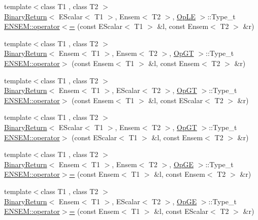 \begin{DoxyCompactItemize}
\item 
{\footnotesize template$<$class T1 , class T2 $>$ }\\\mbox{\hyperlink{structBinaryReturn}{Binary\+Return}}$<$ E\+Scalar$<$ T1 $>$, Ensem$<$ T2 $>$, \mbox{\hyperlink{structOpLE}{Op\+LE}} $>$\+::Type\+\_\+t \mbox{\hyperlink{group__eensem_ga876b949826dc1335f76b3b4e1c32b076}{E\+N\+S\+E\+M\+::operator$<$=}} (const E\+Scalar$<$ T1 $>$ \&l, const Ensem$<$ T2 $>$ \&r)
\item 
{\footnotesize template$<$class T1 , class T2 $>$ }\\\mbox{\hyperlink{structBinaryReturn}{Binary\+Return}}$<$ Ensem$<$ T1 $>$, Ensem$<$ T2 $>$, \mbox{\hyperlink{structOpGT}{Op\+GT}} $>$\+::Type\+\_\+t \mbox{\hyperlink{group__eensem_ga27f81ac9863b6ebd1af9a0927fd2c356}{E\+N\+S\+E\+M\+::operator$>$}} (const Ensem$<$ T1 $>$ \&l, const Ensem$<$ T2 $>$ \&r)
\item 
{\footnotesize template$<$class T1 , class T2 $>$ }\\\mbox{\hyperlink{structBinaryReturn}{Binary\+Return}}$<$ Ensem$<$ T1 $>$, E\+Scalar$<$ T2 $>$, \mbox{\hyperlink{structOpGT}{Op\+GT}} $>$\+::Type\+\_\+t \mbox{\hyperlink{group__eensem_gadb5372b36c1e21728de4e36358b59440}{E\+N\+S\+E\+M\+::operator$>$}} (const Ensem$<$ T1 $>$ \&l, const E\+Scalar$<$ T2 $>$ \&r)
\item 
{\footnotesize template$<$class T1 , class T2 $>$ }\\\mbox{\hyperlink{structBinaryReturn}{Binary\+Return}}$<$ E\+Scalar$<$ T1 $>$, Ensem$<$ T2 $>$, \mbox{\hyperlink{structOpGT}{Op\+GT}} $>$\+::Type\+\_\+t \mbox{\hyperlink{group__eensem_gaf81a55e62404e9b802fbb90aaee678ea}{E\+N\+S\+E\+M\+::operator$>$}} (const E\+Scalar$<$ T1 $>$ \&l, const Ensem$<$ T2 $>$ \&r)
\item 
{\footnotesize template$<$class T1 , class T2 $>$ }\\\mbox{\hyperlink{structBinaryReturn}{Binary\+Return}}$<$ Ensem$<$ T1 $>$, Ensem$<$ T2 $>$, \mbox{\hyperlink{structOpGE}{Op\+GE}} $>$\+::Type\+\_\+t \mbox{\hyperlink{group__eensem_gab4cf01cccb06cf4c911567c3ee6eb808}{E\+N\+S\+E\+M\+::operator$>$=}} (const Ensem$<$ T1 $>$ \&l, const Ensem$<$ T2 $>$ \&r)
\item 
{\footnotesize template$<$class T1 , class T2 $>$ }\\\mbox{\hyperlink{structBinaryReturn}{Binary\+Return}}$<$ Ensem$<$ T1 $>$, E\+Scalar$<$ T2 $>$, \mbox{\hyperlink{structOpGE}{Op\+GE}} $>$\+::Type\+\_\+t \mbox{\hyperlink{group__eensem_gaefcc523be9266958f63fc6b34c2671e8}{E\+N\+S\+E\+M\+::operator$>$=}} (const Ensem$<$ T1 $>$ \&l, const E\+Scalar$<$ T2 $>$ \&r)

\end{DoxyCompactItemize}

